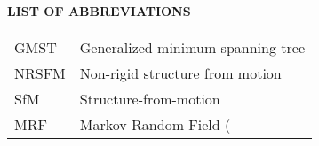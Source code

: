 
{}

\begin{center}
\textbf{LIST OF ABBREVIATIONS}
\vspace{16pt}
\end{center}

\noindent
\begin{tabular}{@{}p{0.8in} l}

GMST & Generalized minimum spanning tree \\
NRSFM & Non-rigid structure from motion \\
SfM & Structure-from-motion \\
MRF & Markov Random Field (
\end{tabular}

\clearpage

